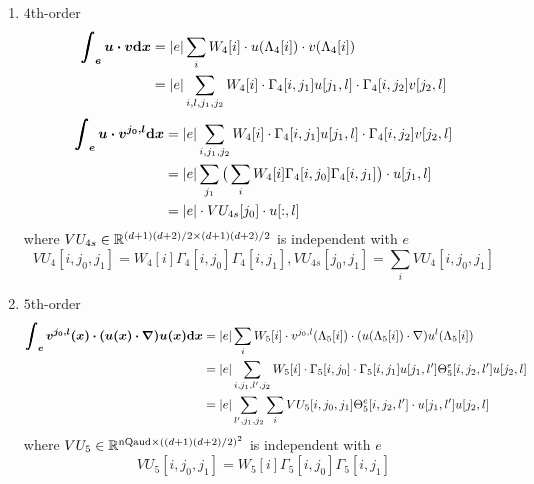 \begin{enumerate}
  \item $4$th-order
    \begin{equation}\label{eq:integral-uv-all}
      \begin{split}
        \bm{\int_e u\cdot v\mathrm{d} x} &= |e| \sum_i W_4[i]
        \cdot u(\Lambda_4[i])\cdot v(\Lambda_4[i]) \\
        &= |e|\sum_{i,l,j_1,j_2}W_4[i]\cdot\Gamma_4[i,j_1]u[j_1,l]
        \cdot \Gamma_4[i,j_2]v[j_2,l]
      \end{split}
    \end{equation}
    \begin{equation}\label{eq:integral-uv}
      \begin{split}
        \bm{\int_e u\cdot v^{j_0,l}\mathrm{d} x} &= |e| \sum_{i,j_1,j_2} W_4[i]
        \cdot\Gamma_4[i,j_1]u[j_1,l]\cdot\Gamma_4[i,j_2]v[j_2,l] \\
        &= |e|\sum_{j_1}\big(\sum_{i} W_4[i]\Gamma_4[i,j_0]\Gamma_4[i,j_1]\big) 
        \cdot u[j_1,l] \\
        &= |e| \cdot VU_{4s}[j_0]\cdot u[:,l]
      \end{split}
    \end{equation}
    where $VU_{4s}\in\mathbb{R}^{(d+1)(d+2)/2\times(d+1)(d+2)/2}$ is independent with $e$
    \[
      VU_4[i,j_0,j_1]=W_4[i]\Gamma_4[i,j_0]\Gamma_4[i,j_1],
      VU_{4s}[j_0,j_1]=\sum_iVU_4[i,j_0,j_1]
    \]

  \item $5$th-order
    \begin{equation}\label{eq:integral-vugu}
      \begin{split}
        \bm{\int_e v^{j_0,l}(x)\cdot(u(x)\cdot\nabla)u(x)\mathrm{d} x}
        &= |e|\sum_i W_5[i]\cdot v^{j_0,l}(\Lambda_5[i]) \cdot 
        (u(\Lambda_5[i])\cdot\nabla)u^l(\Lambda_5[i]) \\
        &= |e|\sum_{i,j_1,l',j_2} W_5[i] \cdot \Gamma_5[i,j_0] \cdot 
        \Gamma_5[i,j_1]u[j_1,l']\Theta_5^e[i,j_2,l']u[j_2,l] \\
        &= |e|\sum_{l',j_1,j_2}\sum_iVU_5[i,j_0,j_1]\Theta_5^e[i,j_2,l']\cdot 
        u[j_1,l']u[j_2,l]
      \end{split}
    \end{equation}
    where $VU_5\in\mathbb{R}^{\text{nQaud}\times((d+1)(d+2)/2)^2}$ is independent with $e$
    \[VU_5[i,j_0,j_1]=W_5[i]\Gamma_5[i,j_0]\Gamma_5[i,j_1]\]


\end{enumerate}
